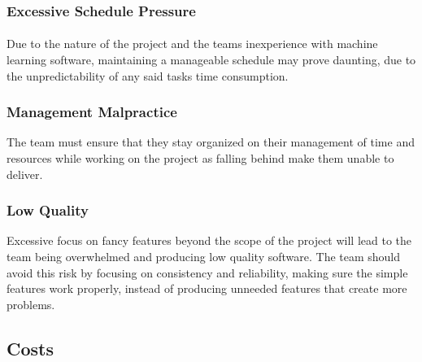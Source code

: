 \documentclass[12pt, titlepage]{article}
\begin{document}
\subsubsection{Excessive Schedule Pressure}
\paragraph{} Due to the nature of the project and the teams inexperience with machine learning software, maintaining a manageable schedule may prove daunting, due to the unpredictability of any said tasks time consumption.

\subsubsection{Management Malpractice}
The team must ensure that they stay organized on their management of time and resources while working on the project as falling behind make them unable to deliver.

\subsubsection{Low Quality}
Excessive focus on fancy features beyond the scope of the project will lead to the team being overwhelmed and producing low quality software. The team should avoid this risk by focusing on consistency and reliability, making sure the simple features work properly, instead of producing unneeded features that create more problems.


\subsection{Costs}

% 
% 
\end{document}
